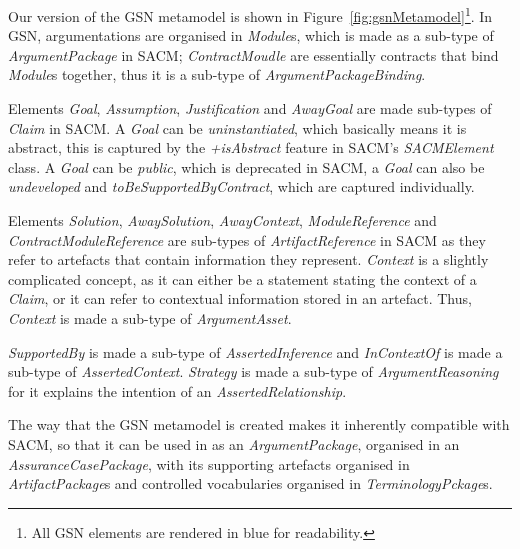 Our version of the GSN metamodel is shown in Figure~\ref{fig:gsnMetamodel}\footnote{All GSN elements are rendered in blue for readability.}. 
In GSN, argumentations are organised in \textit{Module}s, which is made as a sub-type of \textit{ArgumentPackage} in SACM; \textit{ContractMoudle} are essentially contracts that bind \textit{Module}s together, thus it is a sub-type of \textit{ArgumentPackageBinding}. 

Elements \textit{Goal}, \textit{Assumption}, \textit{Justification} and \textit{AwayGoal} are made sub-types of \textit{Claim} in SACM. 
A \textit{Goal} can be \textit{uninstantiated}, which basically means it is abstract, this is captured by the \textit{+isAbstract} feature in SACM's \textit{SACMElement} class. 
A \textit{Goal} can be \textit{public}, which is deprecated in SACM, a \textit{Goal} can also be \textit{undeveloped} and \textit{toBeSupportedByContract}, which are captured individually. 

Elements \textit{Solution}, \textit{AwaySolution}, \textit{AwayContext}, \textit{ModuleReference} and \textit{ContractModuleReference} are sub-types of \textit{ArtifactReference} in SACM as they refer to artefacts that contain information they represent. 
\textit{Context} is a slightly complicated concept, as it can either be a statement stating the context of a \textit{Claim}, or it can refer to contextual information stored in an artefact. 
Thus, \textit{Context} is made a sub-type of \textit{ArgumentAsset}. 

\textit{SupportedBy} is made a sub-type of \textit{AssertedInference} and \textit{InContextOf} is made a sub-type of \textit{AssertedContext}. 
\textit{Strategy} is made a sub-type of \textit{ArgumentReasoning} for it explains the intention of an \textit{AssertedRelationship}.

The way that the GSN metamodel is created makes it inherently compatible with SACM, so that it can be used in as an \textit{ArgumentPackage}, organised in an \textit{AssuranceCasePackage}, with its supporting artefacts organised in \textit{ArtifactPackage}s and controlled vocabularies organised in \textit{TerminologyPckage}s. 

